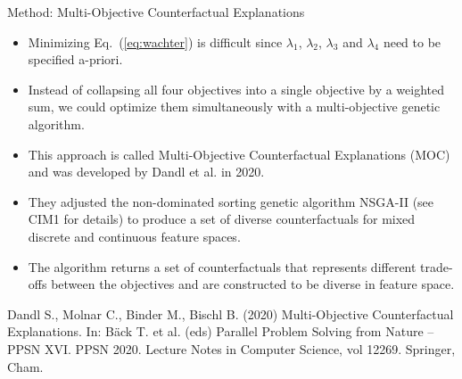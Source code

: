\documentclass[11pt,compress,t,notes=noshow, xcolor=table]{beamer}
\begin{document}
\begin{vbframe}{Method: Multi-Objective Counterfactual Explanations}
	\begin{itemize}
		\item Minimizing Eq.~(\ref{eq:wachter}) is difficult since $\lambda_1$, $\lambda_2$, $\lambda_3$ and $\lambda_4$ need to be specified a-priori. 
		\item Instead of collapsing all four objectives into a single objective by a weighted sum, we could optimize them simultaneously with a multi-objective genetic algorithm. 
		\item This approach is called Multi-Objective Counterfactual Explanations (MOC) and was developed by Dandl et al. in 2020. 
		\item They adjusted the non-dominated sorting genetic algorithm NSGA-II (see CIM1 for details) to produce a set of diverse counterfactuals for mixed discrete and continuous feature spaces.
		\item The algorithm returns a set of counterfactuals that represents different trade-offs between the objectives and are constructed to be diverse in feature space.
	\end{itemize}

	\tiny{Dandl S., Molnar C., Binder M., Bischl B. (2020) Multi-Objective Counterfactual Explanations. In: Bäck T. et al. (eds) Parallel Problem Solving from Nature – PPSN XVI. PPSN 2020. Lecture Notes in Computer Science, vol 12269. Springer, Cham.}
	 
\end{vbframe}
\end{document}
